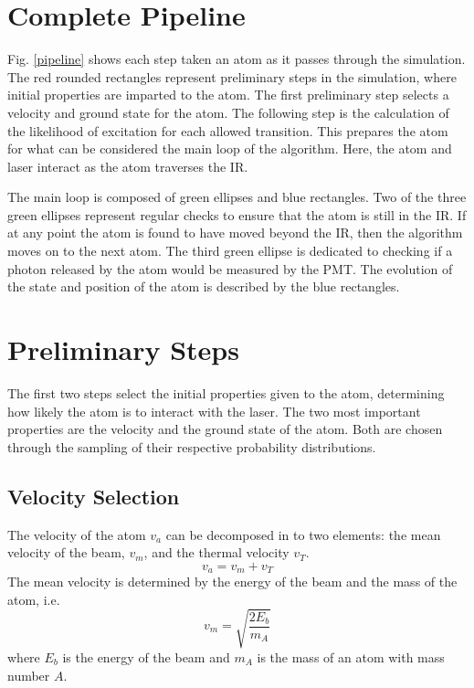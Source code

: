 \documentclass[12pt,a4paper,margin=1in]{report}
\begin{document}
\label{pip}


\section{Complete Pipeline}


Fig. \ref{pipeline} shows each step taken an atom as it passes through the simulation. The red rounded rectangles represent preliminary steps in the simulation, where initial properties are imparted to the atom. The first preliminary step selects a velocity and ground state for the atom. The following step is the calculation of the likelihood of excitation for each allowed transition. This prepares the atom for what can be considered the main loop of the algorithm. Here, the atom and laser interact as the atom traverses the IR. 

The main loop is composed of green ellipses and blue rectangles. Two of the three green ellipses represent regular checks to ensure that the atom is still in the IR. If at any point the atom is found to have moved beyond the IR, then the algorithm moves on to the next atom. The third green ellipse is dedicated to checking if a photon released by the atom would be measured by the PMT. The evolution of the state and position of the atom is described by the blue rectangles. 

\section{Preliminary Steps}
The first two steps select the initial properties given to the atom, determining how likely the atom is to interact with the laser. The two most important properties are the velocity and the ground state of the atom. Both are chosen through the sampling of their respective probability distributions.

\subsection{Velocity Selection}

The velocity of the atom $v_a$ can be decomposed in to two elements: the mean velocity of the beam, $v_{m}$, and the thermal velocity $v_{T}$. 
\begin{equation}
v_a = v_m + v_T
\end{equation}
The mean velocity is determined by the energy of the beam and the mass of the atom, i.e.
\begin{equation}
v_{m} = \sqrt{\frac{2E_b}{m_A}}
\end{equation}
where $E_b$ is the energy of the beam and $m_A$ is the mass of an atom with mass number $A$.
\end{document}
